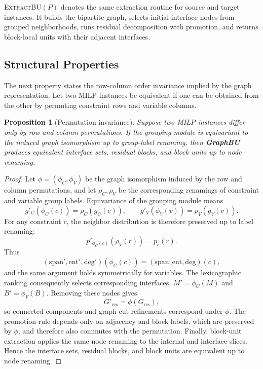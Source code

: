 \documentclass[letterpaper]{article}
\newcommand{\method}{\textbf{GraphBU}\xspace}
\newtheorem{proposition}{Proposition}
\begin{document}
\noindent\textsc{ExtractBU}$(P)$ denotes the same extraction routine for source and target instances. It builds the bipartite graph, selects initial interface nodes from grouped neighborhoods, runs residual decomposition with promotion, and returns block-local units with their adjacent interfaces.

\subsection{Structural Properties}

The next property states the row-column order invariance implied by the graph representation. Let two MILP instances be equivalent if one can be obtained from the other by permuting constraint rows and variable columns.

\begin{proposition}[Permutation invariance]
Suppose two MILP instances differ only by row and column permutations. If the grouping module is equivariant to the induced graph isomorphism up to group-label renaming, then \method produces equivalent interface sets, residual blocks, and block units up to node renaming.
\end{proposition}

\begin{proof}
Let $\phi=(\phi_C,\phi_V)$ be the graph isomorphism induced by the row
and column permutations, and let $\rho_C,\rho_V$ be the corresponding
renamings of constraint and variable group labels. Equivariance of the
grouping module means
\begin{equation}
g'_C(\phi_C(c))=\rho_C(g_C(c)),
\qquad
g'_V(\phi_V(v))=\rho_V(g_V(v)).
\end{equation}
For any constraint $c$, the neighbor distribution is therefore preserved
up to label renaming:
\begin{equation}
p'_{\phi_C(c)}(\rho_V(r)) = p_c(r).
\end{equation}
Thus
\begin{equation}
(\mathrm{span}',\mathrm{ent}',\mathrm{deg}')(\phi_C(c))
=
(\mathrm{span},\mathrm{ent},\mathrm{deg})(c),
\end{equation}
and the same argument holds symmetrically for variables. The
lexicographic ranking consequently selects corresponding interfaces,
$M'=\phi_C(M)$ and $B'=\phi_V(B)$. Removing these nodes gives
\begin{equation}
G'_{\mathrm{res}}
=
\phi(G_{\mathrm{res}}),
\end{equation}
so connected components and graph-cut refinements correspond under
$\phi$. The promotion rule depends only on adjacency and block labels,
which are preserved by $\phi$, and therefore also commutes with the
permutation. Finally, block-unit extraction applies the same node
renaming to the internal and interface slices. Hence the interface
sets, residual blocks, and block units are equivalent up to node
renaming.
\end{proof}
\end{document}
